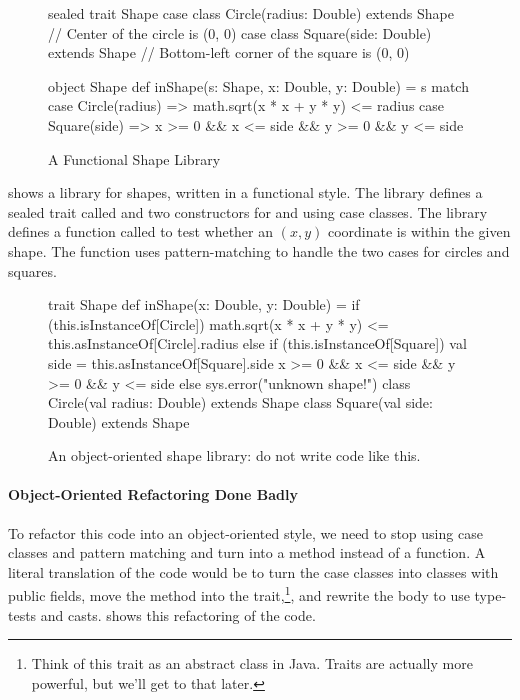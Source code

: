 \documentclass{book}
\begin{document}
\begin{figure}
\begin{scalacode}
sealed trait Shape
case class Circle(radius: Double) extends Shape // Center of the circle is (0, 0)
case class Square(side: Double) extends Shape // Bottom-left corner of the square is (0, 0)

object Shape {
  def inShape(s: Shape, x: Double, y: Double) = s match {
    case Circle(radius) => math.sqrt(x * x + y * y) <= radius
    case Square(side) => x >= 0 && x <= side && y >= 0 && y <= side
  }
}
\end{scalacode}
\caption{A Functional Shape Library}
\label{fshapes1}
\end{figure}

 shows a library for shapes, written in a functional style.
The library defines a sealed trait called  and two
constructors for  and  using
case classes. The library defines a function called 
to test whether an $(x,y)$ coordinate is within the given shape. The function
uses pattern-matching to handle the two cases for circles and squares.

\begin{figure}
\begin{scalacode}
trait Shape {
  def inShape(x: Double, y: Double) = {
    if (this.isInstanceOf[Circle]) {
      math.sqrt(x * x + y * y) <= this.asInstanceOf[Circle].radius
    }
    else if (this.isInstanceOf[Square]) {
      val side = this.asInstanceOf[Square].side
      x >= 0 && x <= side && y >= 0 && y <= side
    }
    else {
      sys.error("unknown shape!")
    }
  }
}
class Circle(val radius: Double) extends Shape
class Square(val side: Double) extends Shape
\end{scalacode}
\caption{An object-oriented shape library: do not write code like this.}
\label{jshapesbad}
\end{figure}

\paragraph{Object-Oriented Refactoring Done Badly} To refactor this code into an
object-oriented style, we need to stop using case classes and pattern matching
and turn  into a method instead of a function.
A literal translation of the code would be to turn the case classes
into classes with public fields, move the method into the 
trait,\footnote{Think of this trait as an abstract class in Java. Traits are actually more powerful, but we'll get to that later.}, and rewrite the body to
use type-tests and casts.
  shows this refactoring of the
code.
\end{document}
